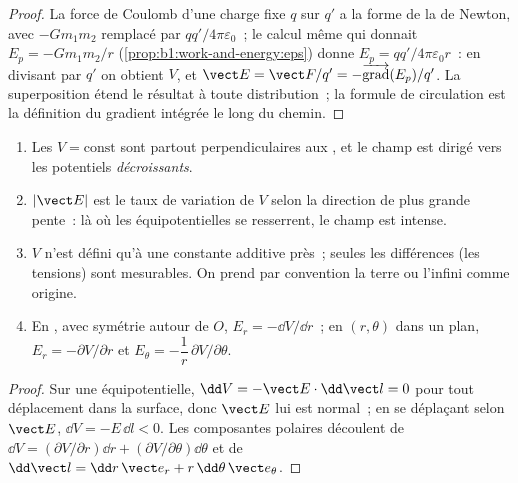 \begin{proof}
La force de Coulomb d'une charge fixe $q$ sur $q'$ a la forme de la
 de Newton, avec $-Gm_1m_2$ remplacé par $qq'/4\pi\varepsilon_0$~; le
calcul même qui donnait $E_p = -Gm_1m_2/r$
(\cref{prop:b1:work-and-energy:eps}) donne $E_p = qq'/4\pi\varepsilon_0r$~: en
divisant par $q'$ on obtient $V$, et $\vect E = \vect F/q' =
-\overrightarrow{\operatorname{grad}}(E_p)/q'$. La superposition étend le
résultat à toute distribution~; la formule de circulation est la définition du
gradient intégrée le long du chemin.
\end{proof}

\begin{proposition}\label{prop:b1:potential-capacitors:reading}
\begin{enumerate}
  \item Les \emph{} $V = \text{const}$ sont partout
        perpendiculaires aux , et le champ est dirigé vers les
        potentiels \emph{décroissants}.
  \item $|\vect E|$ est le taux de variation de $V$ selon la direction de plus
        grande pente~: là où les équipotentielles se resserrent, le champ est intense.
  \item $V$ n'est défini qu'à une constante additive près~; seules les
        différences (les tensions) sont mesurables. On prend par convention la
        terre ou l'infini comme origine.
  \item En , avec symétrie autour de $O$, $E_r = -\dd V/
        \dd r$~; en  $(r, \theta)$ dans un plan,
        $E_r = -\partial V/\partial r$ et $E_\theta = -\dfrac1r\,\partial V/\partial\theta$.
\end{enumerate}
\end{proposition}

\begin{proof}
Sur une équipotentielle, $\dd V = -\vect E\cdot\dd\vect l = 0$ pour tout
déplacement dans la surface, donc $\vect E$ lui est normal~; en se déplaçant
selon $\vect E$, $\dd V = -E\,\dd l < 0$. Les composantes polaires découlent de
$\dd V = (\partial V/\partial r)\dd r + (\partial V/\partial\theta)\dd\theta$ et de
$\dd\vect l = \dd r\,\vect e_r + r\,\dd\theta\,\vect e_\theta$.
\end{proof}


